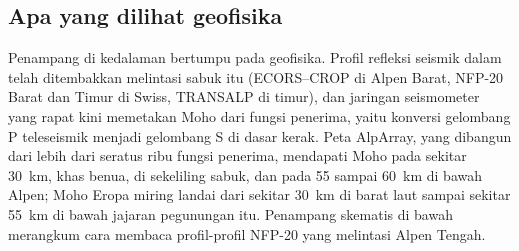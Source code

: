 \subsection*{Apa yang dilihat geofisika}

Penampang di kedalaman bertumpu pada geofisika. Profil refleksi seismik dalam telah ditembakkan
melintasi sabuk itu (ECORS--CROP di Alpen Barat, NFP-20 Barat dan Timur di
Swiss, TRANSALP di timur), dan jaringan seismometer yang rapat kini memetakan Moho
dari fungsi penerima, yaitu konversi gelombang P teleseismik menjadi gelombang S di dasar
kerak. Peta AlpArray, yang dibangun dari lebih dari seratus ribu fungsi penerima,
mendapati Moho pada sekitar \qty{30}{km}, khas benua, di sekeliling sabuk, dan pada 55 sampai
\qty{60}{km} di bawah Alpen; Moho Eropa miring landai dari sekitar \qty{30}{km} di
barat laut sampai sekitar \qty{55}{km} di bawah jajaran pegunungan itu.
Penampang skematis di bawah merangkum cara membaca profil-profil NFP-20 yang melintasi Alpen Tengah.

